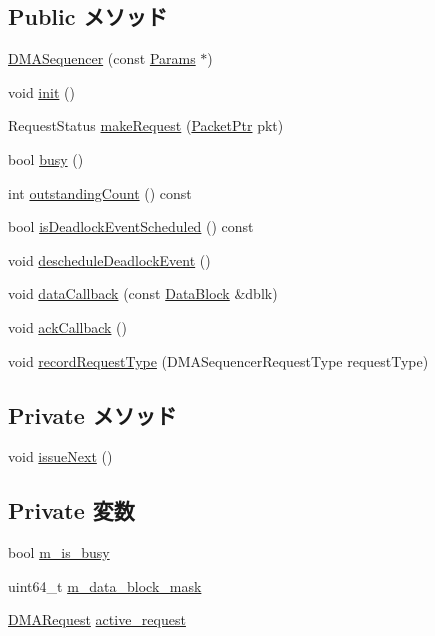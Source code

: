 \subsection*{Public メソッド}
\begin{DoxyCompactItemize}
\item 
\hyperlink{classDMASequencer_ac1df3c513bd70ee946eeead01f511cc8}{DMASequencer} (const \hyperlink{classDMASequencer_a9827bc75ea7fc70f8a78d2545226f251}{Params} $\ast$)
\item 
void \hyperlink{classDMASequencer_a02fd73d861ef2e4aabb38c0c9ff82947}{init} ()
\item 
RequestStatus \hyperlink{classDMASequencer_a23de6e3fbb2362f4410d435e3600d0f7}{makeRequest} (\hyperlink{classPacket}{PacketPtr} pkt)
\item 
bool \hyperlink{classDMASequencer_ae95edfbb78f3030b37041e8051eac019}{busy} ()
\item 
int \hyperlink{classDMASequencer_ae47593dc86baa86bf047ad1fbcdcceed}{outstandingCount} () const 
\item 
bool \hyperlink{classDMASequencer_a11ce018fbd3aa89624b06dbdafbd4ef9}{isDeadlockEventScheduled} () const 
\item 
void \hyperlink{classDMASequencer_a7c9a8861621a62055761f47310814762}{descheduleDeadlockEvent} ()
\item 
void \hyperlink{classDMASequencer_a09bba33767295e37f13886dd74b72d23}{dataCallback} (const \hyperlink{classDataBlock}{DataBlock} \&dblk)
\item 
void \hyperlink{classDMASequencer_ad9143b6ab846dfde9ff4bda44b19f749}{ackCallback} ()
\item 
void \hyperlink{classDMASequencer_a6a9c711db98e308367905995bf8ab52c}{recordRequestType} (DMASequencerRequestType requestType)
\end{DoxyCompactItemize}
\subsection*{Private メソッド}
\begin{DoxyCompactItemize}
\item 
void \hyperlink{classDMASequencer_ac3acb51a52b90c6e61fdddba7434fd9b}{issueNext} ()
\end{DoxyCompactItemize}
\subsection*{Private 変数}
\begin{DoxyCompactItemize}
\item 
bool \hyperlink{classDMASequencer_a26268a7b4af6fad845b715a8b082ab8a}{m\_\-is\_\-busy}
\item 
uint64\_\-t \hyperlink{classDMASequencer_ab6ef6a22fa2f33fcb00664f27f3f1866}{m\_\-data\_\-block\_\-mask}
\item 
\hyperlink{structDMARequest}{DMARequest} \hyperlink{classDMASequencer_a87d1d4cc184a5195caafa5211a90e17f}{active\_\-request}
\end{DoxyCompactItemize}



